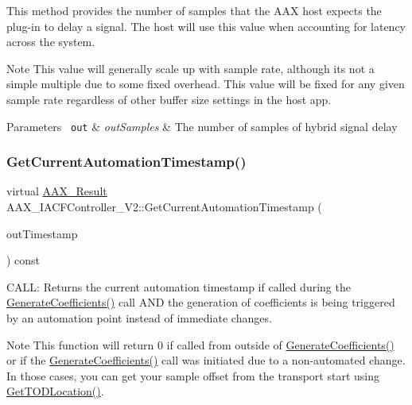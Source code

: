This method provides the number of samples that the A\+AX host expects the plug-\/in to delay a signal. The host will use this value when accounting for latency across the system.

\begin{DoxyNote}{Note}
This value will generally scale up with sample rate, although it\textquotesingle{}s not a simple multiple due to some fixed overhead. This value will be fixed for any given sample rate regardless of other buffer size settings in the host app.
\end{DoxyNote}

\begin{DoxyParams}[1]{Parameters}
\mbox{\texttt{ out}}  & {\em out\+Samples} & The number of samples of hybrid signal delay \\
\hline
\end{DoxyParams}
\mbox{\label{a01641_a0a3bdcf203a721bed5d772b125052ec3}} 
\subsubsection{\texorpdfstring{GetCurrentAutomationTimestamp()}{GetCurrentAutomationTimestamp()}}
{\footnotesize\ttfamily virtual \mbox{\hyperlink{a00392_a4d8f69a697df7f70c3a8e9b8ee130d2f}{A\+A\+X\+\_\+\+Result}} A\+A\+X\+\_\+\+I\+A\+C\+F\+Controller\+\_\+\+V2\+::\+Get\+Current\+Automation\+Timestamp (\begin{DoxyParamCaption}\item[{\mbox{\hyperlink{a00392_ac09cd6857748cc296ac0f8bcc20dc74b}{A\+A\+X\+\_\+\+C\+Transport\+Counter}} $\ast$}]{out\+Timestamp }\end{DoxyParamCaption}) const\hspace{0.3cm}{\ttfamily [pure virtual]}}



C\+A\+LL\+: Returns the current automation timestamp if called during the \mbox{\hyperlink{a01669_a083265b008921b6114ede387711694b7}{Generate\+Coefficients()}} call A\+ND the generation of coefficients is being triggered by an automation point instead of immediate changes. 

\begin{DoxyNote}{Note}
This function will return 0 if called from outside of \mbox{\hyperlink{a01669_a083265b008921b6114ede387711694b7}{Generate\+Coefficients()}} or if the \mbox{\hyperlink{a01669_a083265b008921b6114ede387711694b7}{Generate\+Coefficients()}} call was initiated due to a non-\/automated change. In those cases, you can get your sample offset from the transport start using \mbox{\hyperlink{a01637_af34fa72c0e4043d5746adcf54e2299d7}{Get\+T\+O\+D\+Location()}}.
\end{DoxyNote}

